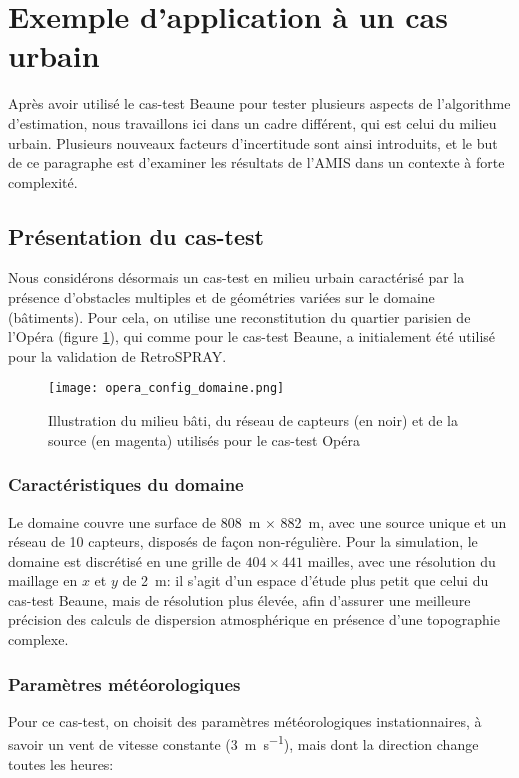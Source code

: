 \section{Exemple d'application à un cas urbain}

Après avoir utilisé le cas-test Beaune pour tester plusieurs aspects de l'algorithme d'estimation, nous travaillons ici dans un cadre différent, qui est celui du milieu urbain. Plusieurs nouveaux facteurs d'incertitude sont ainsi introduits, et le but de ce paragraphe est d'examiner les résultats de l'AMIS dans un contexte à forte complexité.\\

\subsection{Présentation du cas-test}

Nous considérons désormais un cas-test en milieu urbain caractérisé par la présence d'obstacles multiples et de géométries variées sur le domaine (bâtiments). Pour cela, on utilise une reconstitution du quartier parisien de l'Opéra (figure \ref{fig_opera_config}), qui comme pour le cas-test Beaune, a initialement été utilisé pour la validation de RetroSPRAY.\\

\begin{figure}[h!]
	\centering
	\texttt{[image: opera\_config\_domaine.png]}
	\caption{Illustration du milieu bâti, du réseau de capteurs (en noir) et de la source (en magenta) utilisés pour le cas-test Opéra}
	\label{fig_opera_config}
\end{figure}

\subsubsection{Caractéristiques du domaine}
Le domaine couvre une surface de \SI{808}{\meter} $\times$ \SI{882}{\meter}, avec une source unique et un réseau de 10 capteurs, disposés de façon non-régulière. Pour la simulation, le domaine est discrétisé en une grille de $404 \times 441$ mailles, avec une résolution du maillage en $x$ et $y$ de \SI{2}{\meter}: il s'agit d'un espace d'étude plus petit que celui du cas-test Beaune, mais de résolution plus élevée, afin d'assurer une meilleure précision des calculs de dispersion atmosphérique en présence d'une topographie complexe. \\


\subsubsection{Paramètres météorologiques}
Pour ce cas-test, on choisit des paramètres météorologiques instationnaires, à savoir un vent de vitesse constante (\SI{3}{\meter \per \second}), mais dont la direction change toutes les heures:

